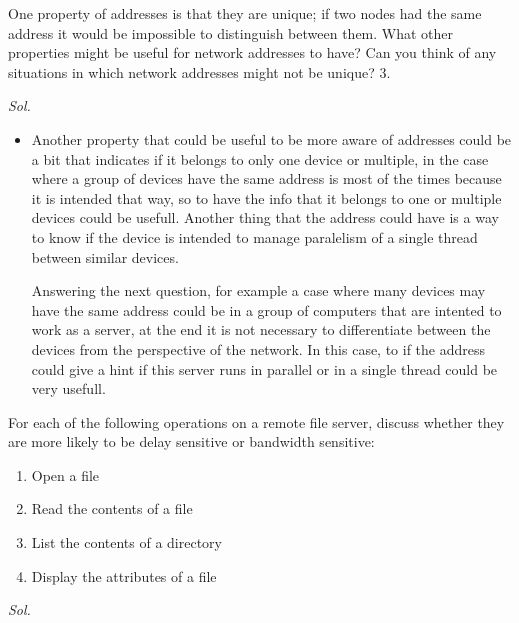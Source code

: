 \documentclass{assignment}
\begin{document}
\newpage
\begin{ex}
  One property of addresses is that they are unique; if two nodes had the same address it would be 
  impossible to distinguish between them. What other properties might be useful for network addresses to 
  have? Can you think of any situations in which network addresses might not be unique?
  3.
\end{ex}
\textit{ Sol. }
\begin{itemize}
  \item Another property that could be useful to be more aware of addresses
    could be a bit that indicates if it belongs to only one device or
    multiple, in the case where a group of devices have the same address is most
    of the times because it is intended that way, so to have the info that it
    belongs to one or multiple devices could be usefull. 
    Another thing that the address could have is a way to know if the device is
    intended to manage paralelism of a single thread between similar devices.

    Answering the next question, for example a case where many devices may have
    the same address could be in a group of computers that are intented to work
    as a server, at the end it is not necessary to differentiate between
    the devices from the perspective of the network. In this case, to if the
    address could give a hint if this server runs in parallel or in a single
    thread could be very usefull.
\end{itemize}

\newpage
\begin{ex}For each of the following operations on a remote file server, discuss whether they are more likely to be 
delay sensitive or bandwidth sensitive:
\begin{enumerate}
  \item Open a file
  \item Read the contents of a file
  \item List the contents of a directory
  \item Display the attributes of a file
\end{enumerate}
\end{ex}
\textit{ Sol. }
\end{document}
